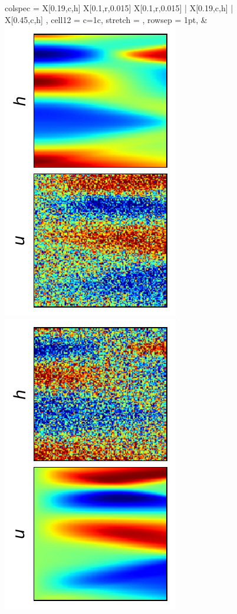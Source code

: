 \documentclass{article}
\begin{document}
\begin{figure}[t]
\begin{tblr}{
  colspec = {X[0.19,c,h] X[0.1,r,0.015] X[0.1,r,0.015] | X[0.19,c,h] | X[0.45,c,h] },
  cell{1}{2} = {c=1}{c}, %
  stretch = ,
  rowsep = 1pt,
}
  & \includegraphics[height=\myheight,trim={8mm 2mm 2mm 2mm},clip]{img/diff_cases/case1_tr.pdf} 
     \includegraphics[height=\myheight,trim={8mm 2mm 2mm 2mm},clip]{img/diff_cases/case2_tr.pdf}

\end{tblr}
\end{figure}
\end{document}

